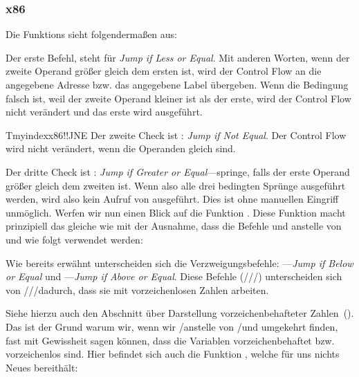 \subsubsection{x86}


Die Funktions  sieht folgendermaßen aus:



Der erste Befehl, \JLE steht für \emph{Jump if Less or Equal}.
Mit anderen Worten, wenn der zweite Operand größer gleich dem ersten ist, wird der Control Flow an die angegebene
Adresse bzw. das angegebene Label übergeben.
Wenn die Bedingung falsch ist, weil der zweite Operand kleiner ist als der erste, wird der Control Flow nicht verändert
und das erste \printf wird ausgeführt.

Tmyindex{x86!\Instructions!JNE}
Der zweite Check ist \JNE: \emph{Jump if Not Equal}.
Der Control Flow wird nicht verändert, wenn die Operanden gleich sind.

Der dritte Check ist \JGE: \emph{Jump if Greater or Equal}---springe, falls der erste Operand größer gleich dem zweiten
ist.
Wenn also alle drei bedingten Sprünge ausgeführt werden, wird also kein Aufruf von \printf ausgeführt.
Dies ist ohne manuellen Eingriff unmöglich.
Werfen wir nun einen Blick auf die Funktion .
Diese Funktion macht prinzipiell das gleiche wie  mit der Ausnahme, dass die Befehle \JBE und \JAE
anstelle von \JLE und \JGE wie folgt verwendet werden:



Wie bereits erwähnt unterscheiden sich die Verzweigungsbefehle:
\JBE---\emph{Jump if Below or Equal} und \JAE---\emph{Jump if Above or Equal}.
Diese Befehle (/\JAE/\JB/\JBE) unterscheiden sich von \JG/\JGE/\JL/\JLE dadurch, dass sie mit vorzeichenlosen Zahlen
arbeiten.

Siehe hierzu auch den Abschnitt über Darstellung vorzeichenbehafteter Zahlen~().
Das ist der Grund warum wir, wenn wir \JG/\JL anstelle von /\JB und umgekehrt finden, fast mit Gewissheit sagen
können, dass die Variablen vorzeichenbehaftet bzw. vorzeichenlos sind.
Hier befindet sich auch die Funktion \main, welche für uns nichts Neues bereithält:

